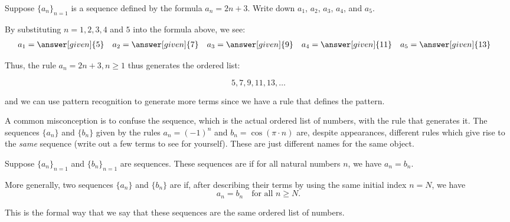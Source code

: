 \documentclass{ximera}
\begin{document}
\begin{example}
Suppose $\{a_n\}_{n=1}$ is a sequence defined by the formula $a_n = 2n+3$.  Write down $a_1$, $a_2$, $a_3$, $a_4$, and $a_5$.

  \begin{explanation}
    By substituting $n=1, 2, 3, 4$ and $5$ into the formula above, we see:
    \begin{align*}
      a_1 &= \answer[given]{5} & 
      a_2 &= \answer[given]{7} & 
      a_3 &= \answer[given]{9} & 
      a_4 &= \answer[given]{11} & 
      a_5 &= \answer[given]{13} 
    \end{align*}
    
Thus, the rule $a_n = 2n+3, n \geq 1$ thus generates the ordered list:

\[
5,7,9,11,13, \dots
\]   

and we can use pattern recognition to generate more terms since we have a rule that defines the pattern.
  \end{explanation}
  
\end{example}

\begin{warning}
  A common misconception is to confuse the sequence, which is the
  actual ordered list of numbers, with the rule that generates it.
  The sequences $\{a_n\}$ and $\{b_n\}$ given by the rules $a_n =
  (-1)^n$ and $b_n = \cos (\pi \cdot n)$ are, despite appearances,
  different rules which give rise to the \textit{same} sequence (write
  out a few terms to see for yourself).  These are just different
  names for the same object.
\end{warning}


\begin{definition}
  Suppose $\{a_n\}_{n=1}$ and $\{b_n\}_{n=1}$ are sequences.  These
  sequences are  if for all
  natural numbers $n$, we have $a_n = b_n$.

  More generally, two sequences $\{a_n\}$ and $\{b_n\}$ are
   if, after describing their terms by using the same initial index $n=N$, we have
  \[
  a_n = b_n \quad \text{for all $n \geq N$.}
  \]
  
  This is the formal way that we say that these sequences are the same ordered list of numbers.
\end{definition}
\end{document}

